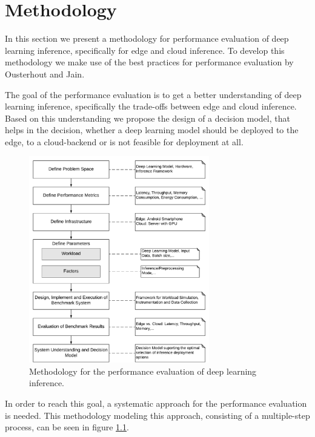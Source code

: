 \chapter{Methodology}
\label{chap:methodology}

In this section we present a methodology for performance evaluation of deep learning inference, specifically for edge and cloud inference.
To develop this methodology we make use of the best practices for performance evaluation by Ousterhout \cite{Ousterhout:2018:AMO:3234519.3213770} and Jain\cite{books/daglib/0076234}.

The goal of the performance evaluation is to get a better understanding of deep learning inference, specifically the trade-offs between edge and cloud inference.
Based on this understanding we propose the design of a decision model, that helps in the decision, whether a deep learning model should be deployed to the edge, to a cloud-backend or is not feasible for deployment at all.


\begin{figure}[!htb]
\centering
\includegraphics[width=0.7\textwidth]{./Bilder/Methodology.pdf}
\caption{Methodology for the performance evaluation of deep learning inference.}
\label{fig:Methodology}
\end{figure}
In order to reach this goal, a systematic approach for the performance evaluation is needed.
This methodology modeling this approach, consisting of a multiple-step process, can be seen in figure \ref{fig:Methodology}. 




